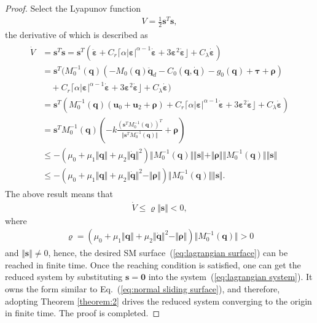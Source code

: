 \documentclass[3p]{elsarticle}
\theoremstyle{plain}
\theoremstyle{remark}
\begin{document}
\begin{proof}
Select the Lyapunov function
\begin{align}
V=\frac{1}{2}\bm s^T\bm s,
\end{align}
the derivative of which is described as
\begin{align}
\begin{split}
\dot V &= \bm s^T\dot{\bm s}=\bm s^T(\ddot{\bm \varepsilon}+C_r\lceil\alpha\vert\bm\varepsilon\vert^{\alpha-1}\dot{\bm \varepsilon}+3\bm \varepsilon^2\dot{\bm \varepsilon}\rfloor+C_\lambda\dot{\bm \varepsilon})\\
&=\bm s^T(M_0^{-1}(\bm q)(-M_0(\bm q)\ddot {\bm q}_d-C_0(\bm q,\dot {\bm q})-g_0(\bm q)+\bm\tau+\bm\rho)\\
&\quad+C_r\lceil\alpha\vert\bm\varepsilon\vert^{\alpha-1}\dot{\bm \varepsilon}+3\bm \varepsilon^2\dot{\bm \varepsilon}\rfloor+C_\lambda\dot{\bm \varepsilon})\\
&=\bm s^T(M_0^{-1}(\bm q)(\bm u_0+\bm u_2+\bm\rho)+C_r\lceil\alpha\vert\bm\varepsilon\vert^{\alpha-1}\dot{\bm \varepsilon}+3\bm \varepsilon^2\dot{\bm \varepsilon}\rfloor+C_\lambda\dot{\bm \varepsilon})\\
&=\bm s^TM_0^{-1}(\bm q)(-k\frac{(\bm s^TM_0^{-1}(\bm q))^T}{\Vert\bm s^TM_0^{-1}(\bm q)\Vert}+\bm\rho)\\
&\le -(\mu_0+\mu_1\Vert\bm q\Vert+\mu_2\Vert\dot{\bm q}\Vert^2)\Vert M_0^{-1}(\bm q)\Vert\Vert \bm s\Vert+\Vert\bm\rho\Vert\Vert M_0^{-1}(\bm q)\Vert\Vert \bm s\Vert\\
&\le -(\mu_0+\mu_1\Vert\bm q\Vert+\mu_2\Vert\dot{\bm q}\Vert^2-\Vert\bm\rho\Vert)\Vert M_0^{-1}(\bm q)\Vert\Vert \bm s\Vert.
\end{split}
\end{align}
The above result means that
\begin{align}
\dot V \le \varrho\Vert\bm s\Vert<0,
\end{align}
where
\begin{align}
\varrho=(\mu_0+\mu_1\Vert\bm q\Vert+\mu_2\Vert\dot{\bm q}\Vert^2-\Vert\bm\rho\Vert)\Vert M_0^{-1}(\bm q)\Vert>0
\end{align}
and $\Vert\bm s\Vert\neq 0$, hence, the desired SM surface~(\ref{eq:lagrangian surface}) can be reached in finite time. Once the reaching condition is satisfied, one can get the reduced system by substituting $\bm s = \bm 0$ into the system~(\ref{eq:lagrangian system}). It owns the form similar to Eq.~(\ref{eq:normal sliding surface}), and therefore, adopting Theorem \ref{theorem:2} drives the reduced system converging to the origin in finite time. The proof is completed.
\end{proof}
\end{document}
